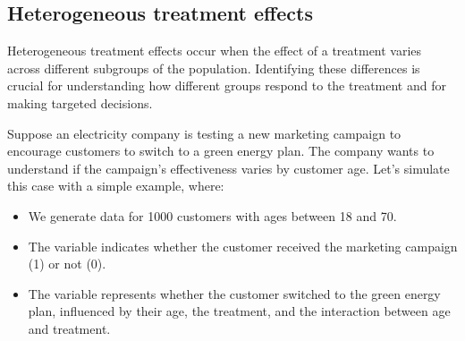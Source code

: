 \documentclass[letterpaper,10pt,english]{jupyterBook}
\begin{document}
\subsection{Heterogeneous treatment effects}
\label{\detokenize{notebooks/AB_testing:heterogeneous-treatment-effects}}
\sphinxAtStartPar
Heterogeneous treatment effects occur when the effect of a treatment varies across different subgroups of the population. Identifying these differences is crucial for understanding how different groups respond to the treatment and for making targeted decisions.

\sphinxAtStartPar
Suppose an electricity company is testing a new marketing campaign to encourage customers to switch to a green energy plan. The company wants to understand if the campaign’s effectiveness varies by customer age. Let’s simulate this case with a simple example, where:
\begin{itemize}
\item {} 
\sphinxAtStartPar
We generate data for 1000 customers with ages between 18 and 70.

\item {} 
\sphinxAtStartPar
The  variable indicates whether the customer received the marketing campaign (1) or not (0).

\item {} 
\sphinxAtStartPar
The  variable represents whether the customer switched to the green energy plan, influenced by their age, the treatment, and the interaction between age and treatment.

\end{itemize}
\end{document}
